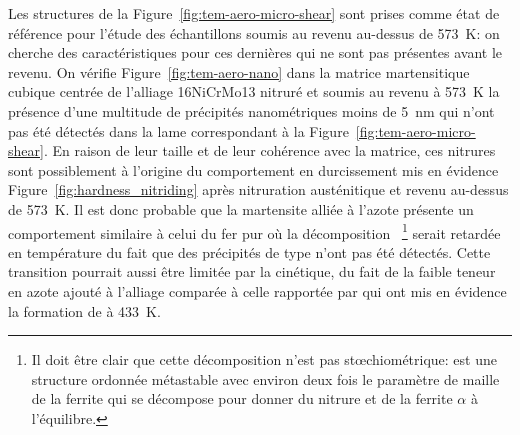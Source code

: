 Les structures de la Figure~\ref{fig:tem-aero-micro-shear} sont prises comme état de référence pour l'étude des échantillons soumis au revenu au-dessus de \SI{573}{\kelvin}: on cherche des caractéristiques pour ces dernières qui ne sont pas présentes avant le revenu. On vérifie Figure~\ref{fig:tem-aero-nano} dans la matrice martensitique cubique centrée de l'alliage 16NiCrMo13 nitruré et soumis au revenu à \SI{573}{\kelvin} la présence d'une multitude de précipités nanométriques \textendash{} moins de \SI{5}{\nano\metre} \textendash{} qui n'ont pas été détectés dans la lame correspondant à la Figure~\ref{fig:tem-aero-micro-shear}. En raison de leur taille et de leur cohérence avec la matrice, ces nitrures sont possiblement à l'origine du comportement en durcissement mis en évidence Figure~\ref{fig:hardness_nitriding} après nitruration austénitique et revenu au-dessus de \SI{573}{\kelvin}. Il est donc probable que la martensite alliée à l'azote présente un comportement similaire à celui du fer pur où la décomposition ~\footnote{Il doit être clair que cette décomposition n'est pas st{\oe}chiométrique:  est une structure ordonnée métastable avec environ deux fois le paramètre de maille de la ferrite qui se décompose pour donner du nitrure  et de la ferrite $\alpha$ à l'équilibre.} serait retardée en température \textemdash{} du fait que des précipités de type  n'ont pas été détectés. Cette transition pourrait aussi être limitée par la cinétique, du fait de la faible teneur en azote ajouté à l'alliage comparée à celle rapportée par \citet{Kaplow1983} qui ont mis en évidence la formation de  à \SI{433}{\kelvin}.


